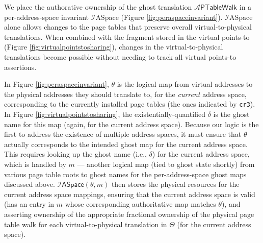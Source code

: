 We place the authorative ownership of the ghost translation $\mathcal{A}\textsf{PTableWalk}$ in a per-address-space invariant
$\mathcal{I}$\textsf{ASpace} (Figure \ref{fig:peraspaceinvariant}). 
$\mathcal{I}$\textsf{ASpace} alone allows changes to the page tables 
that preserve overall virtual-to-physical translations.
When combined with the
fragment stored in the virtual points-to (Figure \ref{fig:virtualpointstosharing}),
changes in the virtual-to-physical translations become possible without needing to track all virtual points-to assertions.

In Figure \ref{fig:peraspaceinvariant},
$\theta$ is the logical map from virtual addresses to the physical addresses they should translate to, 
for the \emph{current} address space, corresponding to the currently installed page tables (the ones
indicated by \lstinline|cr3|). In Figure \ref{fig:virtualpointstosharing}, the existentially-quantified $\delta$
is the ghost name for this map (again, for the current address space).
Because our logic is the first to address the existence of multiple address spaces,
it must ensure that $\theta$ actually corresponds to the intended ghost map for the current address space.
This requires looking up the ghost name (i.e., $\delta$) for the current address space,
which is handled by $m$ --- another logical map (tied to ghost state shortly)
from various page table roots to ghost names for the per-address-space ghost maps discussed above.
$\mathcal{I}\textsf{ASpace}(\theta,m)$ then stores the physical resources for the current address space mappings,
ensuring that the current address space is valid (has an entry in $m$ whose corresponding
authoritative map matches $\theta$), and asserting ownership of the appropriate fractional ownership
of the physical page table walk for each virtual-to-physical translation in $\Theta$ (for the current address space).

